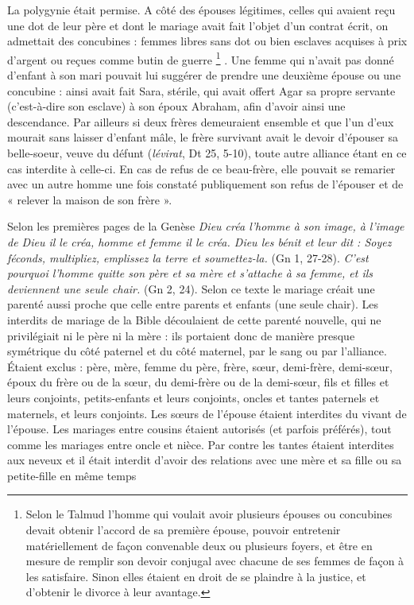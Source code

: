 La polygynie était permise. A côté des épouses légitimes, celles qui avaient reçu une dot de leur père et dont le mariage avait fait l'objet d'un contrat écrit, on admettait des concubines : femmes libres sans dot ou bien esclaves acquises à prix d'argent ou reçues comme butin de guerre%
\footnote{Selon le Talmud l'homme qui voulait avoir plusieurs épouses ou concubines devait obtenir l'accord de sa première épouse, pouvoir entretenir matériellement de façon convenable deux ou plusieurs foyers, et être en mesure de remplir son devoir conjugal avec chacune de ses femmes de façon à les satisfaire. Sinon elles étaient en droit de se plaindre à la justice, et d'obtenir le divorce à leur avantage.}%
. Une femme qui n'avait pas donné d'enfant à son mari pouvait lui suggérer de prendre une deuxième épouse ou une concubine : ainsi avait fait Sara, stérile, qui avait offert Agar sa propre servante (c'est-à-dire son esclave) à son époux Abraham, afin d'avoir ainsi une descendance. Par ailleurs si deux frères demeuraient ensemble et que l'un d'eux  mourait sans laisser d'enfant mâle, le frère survivant avait le devoir d'épouser sa belle-soeur, veuve du défunt (\emph{lévirat}, Dt 25, 5-10), toute autre alliance étant en ce cas interdite à celle-ci. En cas de refus de ce beau-frère, elle pouvait se remarier avec un autre homme une fois constaté publiquement son refus de l'épouser et de « relever la maison de son frère ».



Selon les premières pages de la Genèse \emph{Dieu créa l'homme à son image, à l'image de Dieu il le créa, homme et femme il le créa. Dieu les bénit et leur dit : Soyez féconds, multipliez, emplissez la terre et soumettez-la.} (Gn 1, 27-28). \emph{C'est pourquoi l'homme quitte son père et sa mère et s'attache à sa femme, et ils deviennent une seule chair.} (Gn 2, 24). Selon ce texte le mariage créait une parenté aussi proche que celle entre parents et enfants (une seule chair). Les interdits de mariage de la Bible découlaient de cette parenté nouvelle, qui ne privilégiait ni le père ni la mère : ils portaient donc de manière presque symétrique du côté paternel et du côté maternel, par le sang ou par l'alliance. Étaient exclus : père, mère, femme du père, frère, sœur, demi-frère, demi-sœur, époux du frère ou de la sœur, du demi-frère ou de la demi-sœur, fils et filles et leurs conjoints, petits-enfants et leurs conjoints, oncles et tantes paternels et maternels, et leurs conjoints. Les sœurs de l'épouse étaient interdites du vivant de l'épouse.  Les mariages entre cousins étaient autorisés (et parfois préférés), tout comme les mariages entre oncle et nièce. Par contre les tantes étaient interdites aux neveux et il était interdit d'avoir des relations avec une mère et sa fille ou sa petite-fille en même temps



